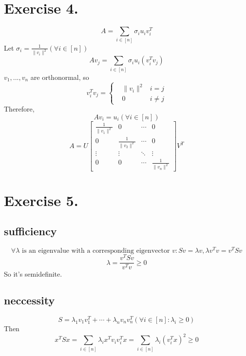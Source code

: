 \documentclass[12pt, a4paper, oneside]{article}
\begin{document}
    \section*{Exercise 4.}
        $$
            A=\sum_{i\in[n]} \sigma_iu_iv_i^T
        $$
        Let $\sigma_i=\frac{1}{\lVert v_i\rVert^2}(\forall i\in [n])$
        $$
            Av_j=\sum_{i\in[n]} \sigma_iu_i(v_i^Tv_j)
        $$
        $v_1, ..., v_n$ are orthonormal, so
        $$
            v_i^Tv_j =\left\{\begin{aligned}
                & \lVert v_i\rVert^2  & i=j\\
                & 0 & i\neq j
            \end{aligned}\right.            
        $$
        Therefore,
        $$
            Av_i=u_i (\forall i\in [n])
        $$
        $$
            A=U\begin{bmatrix}
                \frac{1}{\lVert v_1\rVert^2} & 0 & \cdots & 0\\
                0 & \frac{1}{\lVert v_2\rVert^2} & \cdots & 0\\
                \vdots & \vdots & \ddots & \vdots\\
                0 & 0 & \cdots & \frac{1}{\lVert v_n\rVert^2}
            \end{bmatrix}V^T
        $$
    \section*{Exercise 5.}
        \subsection*{sufficiency}
            $$
                \forall \lambda\text{ is an eigenvalue with a corresponding eigenvector }v:Sv=\lambda v, \lambda v^Tv=v^TSv
            $$
            $$
                \lambda = \frac{v^TSv}{v^Tv}\geq 0
            $$
            So it's semidefinite.
        \subsection*{neccessity}
            $$
                S=\lambda_1v_1v_1^T+\cdots+\lambda_nv_nv_n^T (\forall i\in [n]:\lambda_i\geq 0)
            $$
            Then
            $$
                x^TSx=\sum_{i\in[n]}\lambda_ix^Tv_iv_i^Tx=\sum_{i\in[n]}\lambda_i(v_i^Tx)^2\geq 0
            $$
\end{document}

